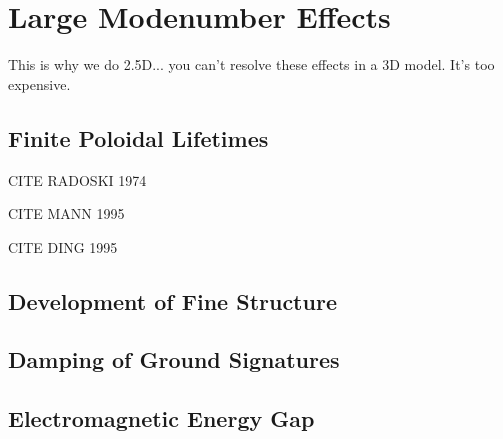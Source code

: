 
\chapter{Large Modenumber Effects}
\label{ch_bigm}

This is why we do 2.5D... you can't resolve these effects in a 3D model. It's too expensive. 

\section{Finite Poloidal Lifetimes}

CITE RADOSKI 1974

CITE MANN 1995

CITE DING 1995

\section{Development of Fine Structure}

\section{Damping of Ground Signatures}

\section{Electromagnetic Energy Gap}

